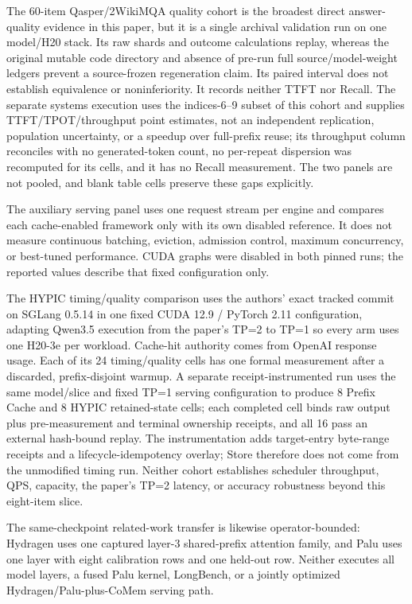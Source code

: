 \documentclass{article}
\begin{document}
The 60-item Qasper/2WikiMQA quality cohort is the broadest direct
answer-quality evidence in this paper, but it is a single archival validation
run on one model/H20 stack. Its raw shards and outcome calculations replay,
whereas the original mutable code directory and absence of pre-run full
source/model-weight ledgers prevent a source-frozen regeneration claim. Its
paired interval does not establish equivalence or noninferiority. It records
neither TTFT nor Recall. The separate systems execution uses the indices-6--9
subset of this cohort and supplies TTFT/TPOT/throughput point estimates, not
an independent replication, population uncertainty, or a speedup over
full-prefix reuse; its throughput column reconciles with no generated-token
count, no per-repeat dispersion was recomputed for its cells, and it has no
Recall measurement. The two panels are not pooled, and blank table cells
preserve these gaps explicitly.

The auxiliary serving panel uses one request stream per engine and compares
each cache-enabled framework only with its own disabled reference.  It does not
measure continuous batching, eviction, admission control, maximum concurrency,
or best-tuned performance.  CUDA graphs were disabled in both pinned runs; the
reported values describe that fixed configuration only.

The HYPIC timing/quality comparison uses the authors' exact tracked commit on
SGLang 0.5.14 in one fixed CUDA 12.9 / PyTorch 2.11 configuration, adapting
Qwen3.5 execution from the paper's TP=2 to TP=1 so every arm uses one H20-3e per
workload.  Cache-hit authority comes from OpenAI response usage.  Each of its 24
timing/quality cells has one formal measurement after a discarded,
prefix-disjoint warmup.  A separate receipt-instrumented run uses the same
model/slice and fixed TP=1 serving configuration to produce 8 Prefix Cache and
8 HYPIC retained-state cells; each completed cell binds raw output plus
pre-measurement and terminal ownership receipts, and all 16 pass an external
hash-bound replay.  The instrumentation adds target-entry byte-range receipts
and a lifecycle-idempotency overlay; Store therefore does not come from the
unmodified timing run.  Neither cohort establishes scheduler throughput, QPS,
capacity, the paper's TP=2 latency, or accuracy robustness beyond this
eight-item slice.

The same-checkpoint related-work transfer is likewise operator-bounded:
Hydragen uses one captured layer-3 shared-prefix attention family, and Palu
uses one layer with eight calibration rows and one held-out row.  Neither
executes all model layers, a fused Palu kernel, LongBench, or a jointly
optimized Hydragen/Palu-plus-CoMem serving path.
\end{document}

